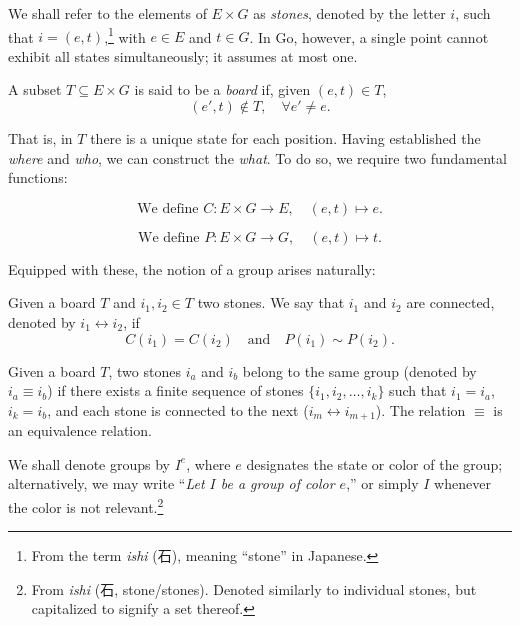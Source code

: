 We shall refer to the elements of \(E \times G\) as \textit{stones}, denoted by the letter \(i\), such that \(i=(e,t)\),\footnote{From the term \textit{ishi} (石), meaning ``stone'' in Japanese.} with \(e \in E\) and \(t \in G\). In Go, however, a single point cannot exhibit all states simultaneously; it assumes at most one.

\begin{definition}[Board]
	A subset \(T \subseteq E \times G\) is said to be a \textit{board} if, given \((e,t) \in T\),
	$$(e',t) \notin T, \quad \forall e' \neq e.$$

\end{definition}

That is, in $T$ there is a unique state for each position. Having established the \textit{where} and \textit{who}, we can construct the \textit{what}. To do so, we require two fundamental functions:

\begin{definition}
	\label{funcioncolor}$$\text{We define } C: E \times G \to E, \quad (e,t) \mapsto e.$$
	\end{definition}
	
\begin{definition}
	\label{funcionposiciion}$$\text{We define } P: E \times G \to G, \quad (e,t) \mapsto t.$$
	\end{definition}
	
Equipped with these, the notion of a group arises naturally:

\begin{definition}[Connection]
	Given a board $T$ and $i_1, i_2 \in T$ two stones. We say that $i_1$ and $i_2$ are connected, denoted by $i_1 \leftrightarrow i_2$, if
	$$C(i_1) = C(i_2) \quad \text{and} \quad P(i_1) \sim P(i_2).$$
\end{definition}


\begin{definition}
	Given a board $T$, two stones $i_a$ and $i_b$ belong to the same group (denoted by $i_a \equiv i_b$) if there exists a finite sequence of stones $\{i_1, i_2, \dots, i_k\}$ such that $i_1 = i_a$, $i_k = i_b$, and each stone is connected to the next ($i_m \leftrightarrow i_{m+1}$). The relation $\equiv$ is an equivalence relation.
	
	We shall denote groups by \(I^e\), where \(e\) designates the state or color of the group; alternatively, we may write ``\textit{Let \(I\) be a group of color \(e\)},'' or simply \(I\) whenever the color is not relevant.\footnote{From \textit{ishi} (石, stone/stones). Denoted similarly to individual stones, but capitalized to signify a set thereof.}
\end{definition}
	


